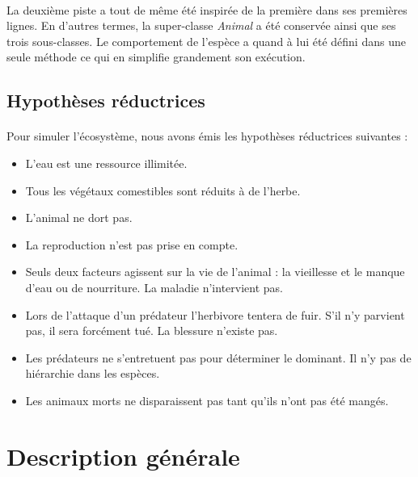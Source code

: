 \documentclass[a4paper,11pt,final,oneside]{article}
\begin{document}
\paragraph{} La deuxième piste a tout de même été inspirée de la première dans ses premières lignes. En d'autres termes, la super-classe \textit{Animal} a été conservée ainsi que ses trois sous-classes. Le comportement de l'espèce a quand à lui été défini dans une seule méthode ce qui en simplifie grandement son exécution.

		\subsection{Hypothèses réductrices}

\paragraph{} Pour simuler l'écosystème, nous avons émis les hypothèses réductrices suivantes :

\begin{itemize}
	\item L'eau est une ressource illimitée.
	\item Tous les végétaux comestibles sont réduits à de l'herbe. 
	\item L'animal ne dort pas.
	\item La reproduction n'est pas prise en compte.
	\item Seuls deux facteurs agissent sur la vie de l'animal : la vieillesse et le manque d'eau ou de nourriture. La maladie n'intervient pas.
	\item Lors de l'attaque d'un prédateur l'herbivore tentera de fuir. S'il n'y parvient pas, il sera forcément tué. La blessure n'existe pas.
	\item Les prédateurs ne s'entretuent pas pour déterminer le dominant. Il n'y pas de hiérarchie dans les espèces.
	\item Les animaux morts ne disparaissent pas tant qu'ils n'ont pas été mangés.
\end{itemize}


	\section{Description générale}
	\label{sec:des}
\end{document}

